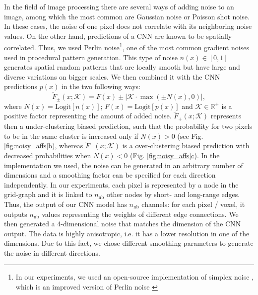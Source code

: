 In the field of image processing there are several ways of adding noise to an image, among which the most common are Gaussian noise or Poisson shot noise. 
In these cases, the noise of one pixel does not correlate with its neighboring noise values. On the other hand, predictions of a CNN are known to be spatially correlated. 
Thus, we used Perlin noise\footnote{In our experiments, we used an open-source implementation of simplex noise \cite{perlin2001noise}, which is an improved version of Perlin noise \cite{perlin1985image}}, one of the most common gradient noises used in procedural pattern generation. This type of noise $n(x)\in[0,1]$ generates spatial random patterns that are locally smooth but have large and diverse variations on bigger scales. We then combined it with the CNN predictions $p(x)$ in the two following ways: 
\begin{equation}\label{eq:noise_biased_predictions}
\tilde{F}_{\pm}(x;\mathcal{K})=F(x)\pm\big|\mathcal{K}\cdot\max\left(\pm N(x),0\right)\big|,
\end{equation}
where  $N(x)=\mathrm{Logit}[n(x)]$; $F(x)=\mathrm{Logit}[p(x)]$ and $\mathcal{K}\in \mathbb{R}^+$ is a positive factor representing the amount of added noise. $\tilde{F}_{+}(x;\mathcal{K})$ represents then a under-clustering biased prediction, such that the probability for two pixels to be in the same cluster is increased only if $N(x)>0$ (see Fig. \hyperref[fig:noisy_affs]{\ref*{fig:noisy_affs}b}), whereas $\tilde{F}_{-}(x;\mathcal{K})$ is a over-clustering biased prediction with decreased probabilities when $N(x)<0$ (Fig. \hyperref[fig:noisy_affs]{\ref*{fig:noisy_affs}c}).
In the implementation we used, the noise can be generated in an arbitrary number of dimensions and a smoothing factor can be specified for each direction independently. In our experiments, each pixel is represented by a node in the grid-graph and it is linked to $n_{\mathrm{nb}}$ other nodes by short- and long-range edges. Thus, the output of our CNN model has $n_{\mathrm{nb}}$ channels: for each pixel / voxel, it outputs $n_{\mathrm{nb}}$ values representing the weights of different edge connections. We then generated a 4-dimensional noise that matches the dimension of the CNN output. The data is highly anisotropic, i.e. it has a lower resolution in one of the dimensions. Due to this fact, we chose different smoothing parameters to generate the noise in different directions. 


